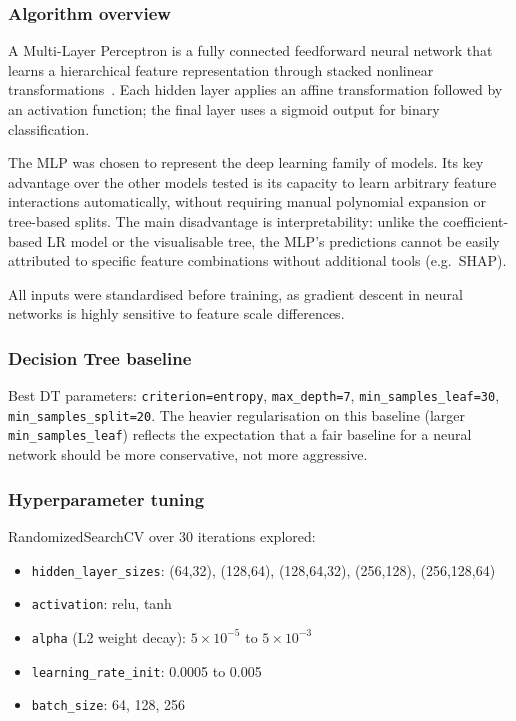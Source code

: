 \documentclass[12pt,a4paper]{article}
\begin{document}
\subsubsection{Algorithm overview}

A Multi-Layer Perceptron is a fully connected feedforward neural network that learns a hierarchical feature representation through stacked nonlinear transformations~\cite{goodfellow2016deep}. Each hidden layer applies an affine transformation followed by an activation function; the final layer uses a sigmoid output for binary classification.

The MLP was chosen to represent the deep learning family of models. Its key advantage over the other models tested is its capacity to learn arbitrary feature interactions automatically, without requiring manual polynomial expansion or tree-based splits. The main disadvantage is interpretability: unlike the coefficient-based LR model or the visualisable tree, the MLP's predictions cannot be easily attributed to specific feature combinations without additional tools (e.g.\ SHAP).

All inputs were standardised before training, as gradient descent in neural networks is highly sensitive to feature scale differences.

\subsubsection{Decision Tree baseline}

Best DT parameters: \texttt{criterion=entropy}, \texttt{max\_depth=7}, \texttt{min\_samples\_leaf=30}, \texttt{min\_samples\_split=20}. The heavier regularisation on this baseline (larger \texttt{min\_samples\_leaf}) reflects the expectation that a fair baseline for a neural network should be more conservative, not more aggressive.

\subsubsection{Hyperparameter tuning}

RandomizedSearchCV over 30 iterations explored:
\begin{itemize}[leftmargin=*, noitemsep]
  \item \texttt{hidden\_layer\_sizes}: (64,32), (128,64), (128,64,32), (256,128), (256,128,64)
  \item \texttt{activation}: relu, tanh
  \item \texttt{alpha} (L2 weight decay): $5 \times 10^{-5}$ to $5 \times 10^{-3}$
  \item \texttt{learning\_rate\_init}: 0.0005 to 0.005
  \item \texttt{batch\_size}: 64, 128, 256
\end{itemize}
\end{document}
